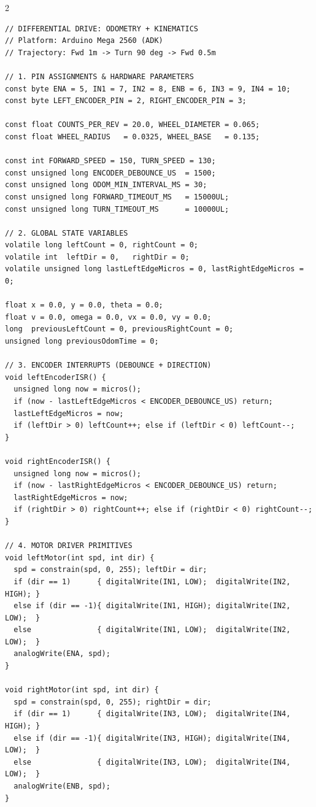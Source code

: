 \documentclass[11pt,a4paper]{article}
\begin{document}
\vspace{0.1cm}
\begin{multicols}{2}
\begin{lstlisting}
// DIFFERENTIAL DRIVE: ODOMETRY + KINEMATICS
// Platform: Arduino Mega 2560 (ADK)
// Trajectory: Fwd 1m -> Turn 90 deg -> Fwd 0.5m

// 1. PIN ASSIGNMENTS & HARDWARE PARAMETERS
const byte ENA = 5, IN1 = 7, IN2 = 8, ENB = 6, IN3 = 9, IN4 = 10;
const byte LEFT_ENCODER_PIN = 2, RIGHT_ENCODER_PIN = 3;

const float COUNTS_PER_REV = 20.0, WHEEL_DIAMETER = 0.065;
const float WHEEL_RADIUS   = 0.0325, WHEEL_BASE   = 0.135;

const int FORWARD_SPEED = 150, TURN_SPEED = 130;
const unsigned long ENCODER_DEBOUNCE_US  = 1500;
const unsigned long ODOM_MIN_INTERVAL_MS = 30;
const unsigned long FORWARD_TIMEOUT_MS   = 15000UL;
const unsigned long TURN_TIMEOUT_MS      = 10000UL;

// 2. GLOBAL STATE VARIABLES
volatile long leftCount = 0, rightCount = 0;
volatile int  leftDir = 0,   rightDir = 0;
volatile unsigned long lastLeftEdgeMicros = 0, lastRightEdgeMicros = 0;

float x = 0.0, y = 0.0, theta = 0.0;
float v = 0.0, omega = 0.0, vx = 0.0, vy = 0.0;
long  previousLeftCount = 0, previousRightCount = 0;
unsigned long previousOdomTime = 0;

// 3. ENCODER INTERRUPTS (DEBOUNCE + DIRECTION)
void leftEncoderISR() {
  unsigned long now = micros();
  if (now - lastLeftEdgeMicros < ENCODER_DEBOUNCE_US) return;
  lastLeftEdgeMicros = now;
  if (leftDir > 0) leftCount++; else if (leftDir < 0) leftCount--;
}

void rightEncoderISR() {
  unsigned long now = micros();
  if (now - lastRightEdgeMicros < ENCODER_DEBOUNCE_US) return;
  lastRightEdgeMicros = now;
  if (rightDir > 0) rightCount++; else if (rightDir < 0) rightCount--;
}

// 4. MOTOR DRIVER PRIMITIVES
void leftMotor(int spd, int dir) {
  spd = constrain(spd, 0, 255); leftDir = dir;
  if (dir == 1)      { digitalWrite(IN1, LOW);  digitalWrite(IN2, HIGH); }
  else if (dir == -1){ digitalWrite(IN1, HIGH); digitalWrite(IN2, LOW);  }
  else               { digitalWrite(IN1, LOW);  digitalWrite(IN2, LOW);  }
  analogWrite(ENA, spd);
}

void rightMotor(int spd, int dir) {
  spd = constrain(spd, 0, 255); rightDir = dir;
  if (dir == 1)      { digitalWrite(IN3, LOW);  digitalWrite(IN4, HIGH); }
  else if (dir == -1){ digitalWrite(IN3, HIGH); digitalWrite(IN4, LOW);  }
  else               { digitalWrite(IN3, LOW);  digitalWrite(IN4, LOW);  }
  analogWrite(ENB, spd);
}


\end{lstlisting}
\end{multicols}
\end{document}
